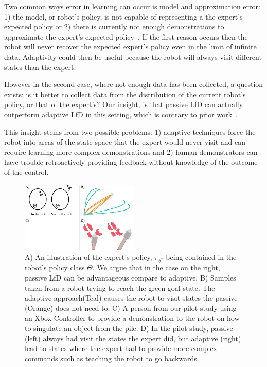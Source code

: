 \documentclass[10pt, conference]{ieeeconf}      %
\begin{document}
Two common ways error in learning can occur is model and approximation error: 1) the model, or robot's policy, is not capable of representing a the expert's expected policy or 2) there is currently not enough demonstrations to approximate the  expert's expected policy~\cite{scholkopf2002learning}. If the first reason occurs then the robot will never recover the expected expert's policy even in the limit of infinite data. Adaptivity could then be useful because the robot will always visit different states than the expert. 

However in the second case, where not enough data has been collected, a question exists: is it better to collect data from the distribution of the current robot's policy, or that of the expert's? Our insight, is that passive LfD can actually outperform adaptive LfD in this setting, which is contrary to prior work~\cite{ross2010efficient,ross2010reduction}.


This insight stems from two possible problems: 1) adaptive techniques force the robot into areas of the state space that the expert would never visit and can require learning more complex demonstrations and 2) human demonstrators can have trouble retroactively providing feedback without knowledge of the outcome of the control. 

\begin{figure}
\center
\includegraphics[width=0.5\textwidth]{f_figs/teaser.eps}
\caption{
    \footnotesize
A) An illustration of  the expert's policy, $\pi_{\theta^*}$ being contained in the robot's policy class $\Theta$. We argue that in the case on the right, passive LfD can be advantageous compare to adaptive. B) Samples taken from a robot trying to reach the green goal state. The adaptive approach(Teal) causes the robot to visit states the passive (Orange) does not need to. C) A person from our pilot study using an Xbox Controller to provide a demonstration to the robot on how to singulate an object from the pile. D) In the pilot study,  passive (left) always had visit the states the expert did, but adaptive (right) lead to states where the expert had to provide more complex commands such as teaching the robot to go backwards.}
\vspace*{-20pt}
\label{fig:teaserl}
\end{figure}
\end{document}
